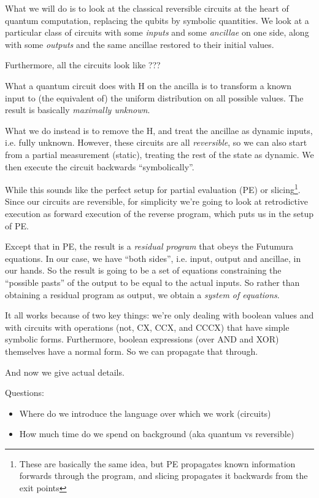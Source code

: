 \documentclass[sigplan]{acmart}
\begin{document}
What we will do is to look at the classical reversible circuits at the heart
of quantum computation, replacing the qubits by symbolic quantities. We look at a particular
class of circuits with some \emph{inputs} and some \emph{ancillae} on one side, along
with some \emph{outputs} and the same ancillae restored to their initial values.

Furthermore, all the circuits look like ???

What a quantum circuit does with H on the ancilla is to transform a known input to
(the equivalent of) the uniform distribution on all possible values. The result is
basically \emph{maximally unknown}.

What we do instead is to remove the H, and treat the ancillae as dynamic inputs, i.e.
fully unknown. However, these circuits are all \emph{reversible}, so we can also 
start from a partial measurement (static), treating the rest of the state as dynamic.
We then execute the circuit backwards ``symbolically''.

While this sounds like the perfect setup for partial evaluation (PE) or slicing\footnote{
These are basically the same idea, but PE propagates known information forwards
through the program, and slicing propagates it backwards from the exit points}.
Since our circuits are reversible, for simplicity we're going to look at retrodictive
execution as forward execution of the reverse program, which puts us in the setup of PE.

Except that in PE, the result is a \emph{residual program} that obeys the Futumura equations.
In our case, we have ``both sides'', i.e. input, output and ancillae, in our hands. So the
result is going to be a set of equations constraining the ``possible pasts'' of the output
to be equal to the actual inputs. So rather than obtaining a residual program as output,
we obtain a \emph{system of equations}.

It all works because of two key things: we're only dealing with boolean values and with
circuits with operations (not, CX, CCX, and CCCX) that have simple symbolic forms.
Furthermore, boolean expressions (over AND and XOR) themselves have a normal form. So
we can propagate that through.

And now we give actual details.

Questions:
\begin{itemize}
  \item Where do we introduce the language over which we work (circuits)
  \item How much time do we spend on background (aka quantum vs reversible)
\end{itemize}
\end{document}
